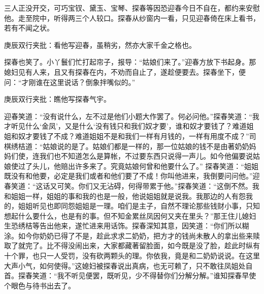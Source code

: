\begin{parag}
    三人正没开交，可巧宝钗、黛玉、宝琴、探春等因恐迎春今日不自在，都约来安慰他。走至院中，听得两三个人较口。探春从纱窗内一看，只见迎春倚在床上看书，若有不闻之状。\begin{note}庚辰双行夹批：看他写迎春，虽稍劣，然亦大家千金之格也。\end{note}探春也笑了。小丫鬟们忙打起帘子，报导：“姑娘们来了。”迎春方放下书起身。那媳妇见有人来，且又有探春在内，不劝而自止了，遂趁便要去。探春坐下，便问：“才刚谁在这里说话？倒象拌嘴似的。”\begin{note}庚辰双行夹批：瞧他写探春气宇。\end{note}迎春笑道：“没有说什么，左不过是他们小题大作罢了。何必问他。”探春笑道：“我才听见什么‘金凤’，又是什么‘没有钱只和我们奴才要’，谁和奴才要钱了？难道姐姐和奴才要钱了不成？难道姐姐不是和我们一样有月钱的，一样有用度不成？”司棋绣桔道：“姑娘说的是了。姑娘们都是一样的，那一位姑娘的钱不是由著奶奶妈妈们使，连我们也不知道怎么是算帐，不过要东西只说得一声儿。如今他偏要说姑娘使过了头儿，他赔出许多来了。究竟姑娘何曾和他要什么了。” 探春笑道：“姐姐既没有和他要，必定是我们或者和他们要了不成！你叫他进来，我倒要问问他。”迎春笑道：“这话又可笑。你们又无沾碍，何得带累于他。”探春笑道：“这倒不然。我和姐姐一样，姐姐的事和我的也是一般，他说姐姐就是说我。我那边的人有怨我的，姐姐听见也即同怨姐姐是一理。咱们是主子，自然不理论那些钱财小事，只知想起什么要什么，也是有的事。但不知金累丝凤因何又夹在里头？”那王住儿媳妇生恐绣桔等告出他来，遂忙进来用话饰。探春深知其意，因笑道：“你们所以糊涂。如今你奶奶已得了不是，趁此求求二奶奶，把方才的钱尚未散人的拿出些来赎取了就完了。比不得没闹出来，大家都藏著留脸面，如今既是没了脸，趁此时纵有十个罪，也只一人受罚，没有砍两颗头的理。你依我，竟是和二奶奶说说。在这里大声小气，如何使得。”这媳妇被探春说出真病，也无可赖了，只不敢往凤姐处自首。探春笑道：“我不听见便罢，既听见，少不得替你们分解分解。”谁知探春早使个眼色与待书出去了。
\end{parag}


